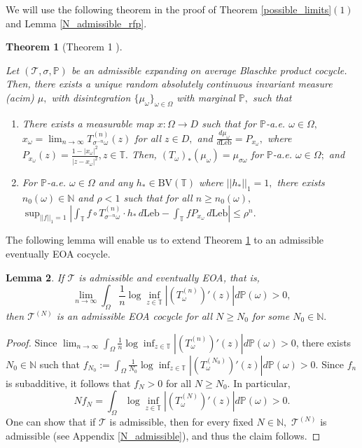 \documentclass[12pt,reqno]{amsart}
\newtheorem{theorem}{Theorem}
\numberwithin{theorem}{section}
\newtheorem{lemma}[theorem]{Lemma}
\begin{document}
We will use the following theorem in the proof of Theorem \ref{possible_limits}$(1)$ and Lemma \ref{N_admissible_rfp}.

\begin{theorem}[Theorem 1 \cite{preprint}]\label{buzzi_blaschke}

    Let $(\mathcal{T}, \sigma, \mathbb{P})$ be an admissible expanding on average Blaschke product cocycle.
    Then, there exists a unique random absolutely continuous invariant measure (acim) $\mu,$ with disintegration $\{\mu_{\omega}\}_{\omega\in\Omega}$ with marginal $\mathbb{P},$ such that \begin{enumerate}[label=(\roman*)]
        \item There exists a measurable map $x:\Omega\to D$ such that for $\mathbb{P}$-a.e. $\omega\in\Omega,$ $x_{\omega}=\lim_{n\to\infty}T_{\sigma^{-n}\omega}^{(n)}(z)$ for all $z\in D,$ and $\frac{d\mu_{\omega}}{d\text{Leb}}=P_{x_{\omega}},$ where $P_{x_{\omega}}  (z)=\frac{1-|x_{\omega}|^2}{|z-x_{\omega}|^2}, z\in\mathbb{T}.$ Then, $(T_{\omega})_{*}(\mu_{\omega})=\mu_{\sigma\omega}$ for $\mathbb{P}$-a.e. $\omega\in\Omega;$ and \label{main_thm_rfp} 
        \item For $\mathbb{P}$-a.e. $\omega\in\Omega$ and any $h_{*}\in\text{BV}(\mathbb{T})$ where $||h_{*}||_{1}=1,$ there exists $n_{0}(\omega)\in\mathbb{N}$ and $\rho<1$ such that for all $n\ge n_{0}(\omega),$ $\sup_{||f||_1=1}\left|\int_{\mathbb{T}}f\circ T_{\sigma^{-n}\omega}^{(n)}\cdot h_{*}\,d\text{Leb}-\int_{\mathbb{T}}f P_{x_{\omega}}\,d\text{Leb}\right|\le\rho^{n}.$ \label{main_thm_diff_bound}

    \end{enumerate}
\end{theorem}

 The following lemma will enable us to extend Theorem \ref{buzzi_blaschke} to an admissible eventually EOA cocycle. \begin{lemma}\label{N_EOA_admissible}
    If $\mathcal{T}$ is admissible and eventually EOA, that is, $$\lim_{n\to\infty}\int_{\Omega}\frac{1}{n}\log\inf_{z\in\mathbb{T}}|(T_{\omega}^{(n)})'(z)|d\mathbb{P}(\omega)>0,$$ then $\mathcal{T}^{(N)}$ is an admissible EOA cocycle for all $N\ge N_{0}$ for some $N_{0}\in\mathbb{N}.$
\end{lemma}
\begin{proof}
     Since $\lim_{n\to\infty}\int_{\Omega}\frac{1}{n}\log\inf_{z\in\mathbb{T}}|(T_{\omega}^{(n)})'(z)|d\mathbb{P}(\omega)>0$, there exists $N_{0}\in\mathbb{N}$ such that $f_{N_0}:=\int_{\Omega}\frac{1}{N_0}\log\inf_{z\in\mathbb{T}}|(T_{\omega}^{(N_0)})'(z)|d\mathbb{P}(\omega)>0.$ Since $f_n$ is subadditive, it follows that $f_N>0$ for all $N\ge N_{0}.$  In particular, $$Nf_N=\int_{\Omega}\log\inf_{z\in\mathbb{T}}|(T_{\omega}^{(N)})'(z)|d\mathbb{P}(\omega)>0.$$ One can show that if $\mathcal{T}$ is admissible, then for every fixed $N\in\mathbb{N},$ $\mathcal{T}^{(N)}$ is admissible (see Appendix \ref{N_admissible}), and thus the claim follows.
\end{proof}
\end{document}
